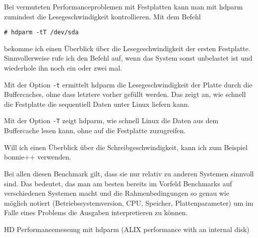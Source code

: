 \begin{normaltext}
  Bei vermuteten Performanceproblemen mit Festplatten kann man mit hdparm
  zumindest die Lesegeschwindigkeit kontrollieren. Mit dem Befehl
  \begin{verbatim}
# hdparm -tT /dev/sda
  \end{verbatim}
  bekomme ich einen Überblick über die Lesegeschwindigkeit der ersten
  Festplatte.
  Sinnvollerweise rufe ich den Befehl auf, wenn
  das System sonst unbelastet ist und wiederhole ihn noch ein oder zwei mal.

  Mit der Option \verb?-t? ermittelt hdparm die Lesegeschwindigkeit der Platte
  durch die Buffercaches, ohne dass letztere vorher gefüllt werden. Das zeigt
  an, wie schnell die Festplatte die sequentiell Daten unter Linux liefern
  kann.

  Mit der Option \verb?-T? zeigt hdparm, wie schnell Linux die Daten aus dem
  Buffercache lesen kann, ohne auf die Festplatte zuzugreifen.

  Will ich einen Überblick über die Schreibgeschwindigkeit, kann ich zum
  Beispiel bonnie++ verwenden.

  Bei allen diesen Benchmark gilt, dass sie nur relativ zu anderen Systemen
  sinnvoll sind. Das bedeutet, das man am besten bereits im Vorfeld Benchmarks
  auf verschiedenen Systemen macht und die Rahmenbedingungen so genau wie
  möglich notiert (Betriebssystemversion, CPU, Speicher, Plattenparameter) um
  im Falle eines Problems die Ausgaben interpretieren zu können.
\end{normaltext}

\begin{notes}
\item HD Performancemessung mit hdparm (ALIX performance with an
  internal disk)
\end{notes}







